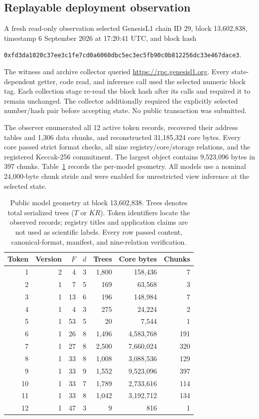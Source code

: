 \documentclass{ledger}
\newcommand{\hashpair}[2]{\texttt{#1}\allowbreak\texttt{#2}}
\begin{document}
\subsection{Replayable deployment observation}
\label{sec:deployment}

A fresh read-only observation selected GenesisL1 chain ID 29, block
13,602,838, timestamp 6 September 2026 at 17:20:41 UTC, and block hash
\begin{center}
\small\hashpair{0xfd3da1020c37ee3c1fe7cd0a6060dbc5e}{c3ec5fb90c0b812256dc33e467dace3}.
\end{center}
The witness and archive collector queried \url{https://rpc.genesisl1.org}.
Every state-dependent getter, code read, and inference call used the selected
numeric block tag. Each collection stage re-read the block hash after its
calls and required it to remain unchanged. The collector additionally
required the explicitly selected number/hash pair before accepting state.
No public transaction was submitted.

The observer enumerated all 12 active token records, recovered their address
tables and 1,306 data chunks, and reconstructed 31,185,324 core bytes. Every
core passed strict format checks, all nine registry/core/storage relations,
and the registered Keccak-256 commitment. The largest object contains
9,523,096 bytes in 397 chunks. Table~\ref{tab:deployment} records the
per-model geometry. All models use a nominal 24,000-byte chunk stride and
were enabled for unrestricted view inference at the selected state.

\begin{table}[htbp]
\centering
\small
\caption{Public model geometry at block 13,602,838. Trees denotes total
serialized trees ($T$ or $KR$). Token identifiers locate the observed records;
registry titles and application claims are not used as scientific labels.
Every row passed content, canonical-format, manifest, and nine-relation
verification.}
\label{tab:deployment}
\begin{tabular}{@{}rrrrrrr@{}}
\toprule
Token & Version & $F$ & $d$ & Trees & Core bytes & Chunks\\
\midrule
1 & 2 & 4 & 3 & 1,800 & 158,436 & 7\\
2 & 1 & 7 & 5 & 169 & 63,568 & 3\\
3 & 1 & 13 & 6 & 196 & 148,984 & 7\\
4 & 1 & 4 & 3 & 275 & 24,224 & 2\\
5 & 1 & 53 & 5 & 20 & 7,544 & 1\\
6 & 1 & 26 & 8 & 1,496 & 4,583,768 & 191\\
7 & 1 & 27 & 8 & 2,500 & 7,660,024 & 320\\
8 & 1 & 33 & 8 & 1,008 & 3,088,536 & 129\\
9 & 1 & 33 & 9 & 1,552 & 9,523,096 & 397\\
10 & 1 & 33 & 7 & 1,789 & 2,733,616 & 114\\
11 & 1 & 33 & 8 & 1,042 & 3,192,712 & 134\\
12 & 1 & 47 & 3 & 9 & 816 & 1\\
\bottomrule
\end{tabular}
\end{table}
\end{document}
